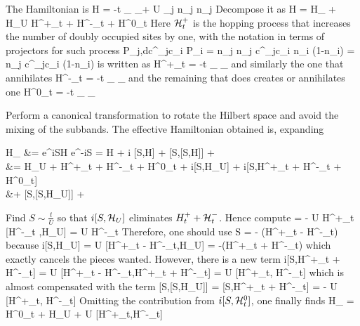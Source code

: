		The Hamiltonian is
		\be \mc H = -t \sum_{} \sum_ + U \sum_j n_{j\uparrow} n_{j\downarrow} \ee
		Decompose it as
		\be \mc H = \mc H_ + \mc H_U  \mc H^+_t + \mc H^-_t + \mc H^0_t \ee
		Here $\mathcal H^+_t$ is the hopping process that increases the number of doubly occupied sites by one, with the notation in terms of projectors for such process
		\be P_{j,d}c^\dagger_{j\uparrow}c_{i\uparrow} P_{i\uparrow} = n_{j\uparrow} n_{j\downarrow} c^\dagger_{j\uparrow}c_{i\uparrow} n_{i\uparrow} (1-n_{i\downarrow}) = n_{j\downarrow} c^\dagger_{j\uparrow}c_{i\uparrow} (1-n_{i\downarrow}) \ee
		is written as
		\be \mc H^+_t = -t \sum_{} \sum_ \ee
		and similarly the one that annihilates 
		\be \mc H^-_t = -t \sum_{} \sum_ \ee
		and the remaining that does creates or annihilates one
		\be \mc H^0_t = -t \sum_{} \sum_ \ee

		Perform a canonical transformation to rotate the Hilbert space and avoid the mixing of the subbands. The effective Hamiltonian obtained is, expanding
		\be \begin{split} \mc H_ &= e^{iS}\mc H e^{-iS} = \mc H + i [S,\mc H] + [S,[S,\mc H]] + \cdots \\ &= \mc H_U + \mc H^+_t + \mc H^-_t + \mc H^0_t + i[S,\mc H_U] + i[S,\mc H^+_t + \mc H^-_t + \mc H^0_t] \\ &+ [S,[S,\mc H_U]] + \cdots \end{split} \ee
		Find $S\sim \frac t U$ so that $i[S,\mathcal H_U]$ eliminates $H^+_t + \mathcal H^-_t$. Hence compute
		\be [\mc H^+_t ,\mc H_U] = - U \mc H^+_t  [\mc H^-_t ,\mc H_U] = U \mc H^-_t \ee
		Therefore, one should use
		\be S = -  (\mc H^+_t - \mc H^-_t) \ee
		because
		\be i[S,\mc H_U] =  U [\mc H^+_t - \mc H^-_t,\mc H_U] = -(\mc H^+_t + \mc H^-_t) \ee
		which exactly cancels the pieces wanted. However, there is a new term
		\be i[S,\mc H^+_t + \mc H^-_t] =  U [\mc H^+_t - \mc H^-_t,\mc H^+_t + \mc H^-_t] =  U [\mc H^+_t, \mc H^-_t] \ee
		which is almost compensated with the term
		\be {} [S,[S,\mc H_U]] =  [S,\mc H^+_t + \mc H^-_t] = -  U [\mc H^+_t, \mc H^-_t] \ee
		Omitting the contribution from $i[S,\mathcal H^0_t]$, one finally finds
		\be \mc H_ = \mc H^0_t + \mc H_U +  U [\mc H^+_t,\mc H^-_t] \ee


